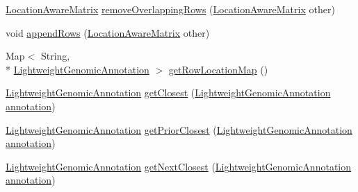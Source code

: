 \begin{DoxyCompactItemize}
\item 
\hyperlink{classbroad_1_1pda_1_1datastructures_1_1_location_aware_matrix}{Location\+Aware\+Matrix} \hyperlink{classbroad_1_1pda_1_1datastructures_1_1_location_aware_matrix_a343230e0d3a3e96ae96865bd43ebc9f3}{remove\+Overlapping\+Rows} (\hyperlink{classbroad_1_1pda_1_1datastructures_1_1_location_aware_matrix}{Location\+Aware\+Matrix} other)
\item 
void \hyperlink{classbroad_1_1pda_1_1datastructures_1_1_location_aware_matrix_acf69c339f06767a98198b6fa18150b5b}{append\+Rows} (\hyperlink{classbroad_1_1pda_1_1datastructures_1_1_location_aware_matrix}{Location\+Aware\+Matrix} other)
\item 
Map$<$ String, \\*
\hyperlink{interfacebroad_1_1core_1_1annotation_1_1_lightweight_genomic_annotation}{Lightweight\+Genomic\+Annotation} $>$ \hyperlink{classbroad_1_1pda_1_1datastructures_1_1_location_aware_matrix_a58c5ec3cf67ef67dcb837812f48b47f0}{get\+Row\+Location\+Map} ()
\item 
\hyperlink{interfacebroad_1_1core_1_1annotation_1_1_lightweight_genomic_annotation}{Lightweight\+Genomic\+Annotation} \hyperlink{classbroad_1_1pda_1_1datastructures_1_1_location_aware_matrix_a568bcf953a7d2ae720f51a9b196106c2}{get\+Closest} (\hyperlink{interfacebroad_1_1core_1_1annotation_1_1_lightweight_genomic_annotation}{Lightweight\+Genomic\+Annotation} \hyperlink{classbroad_1_1pda_1_1datastructures_1_1_location_aware_matrix_ab12829b4bec6392f73ef867a924dd00b}{annotation})
\item 
\hyperlink{interfacebroad_1_1core_1_1annotation_1_1_lightweight_genomic_annotation}{Lightweight\+Genomic\+Annotation} \hyperlink{classbroad_1_1pda_1_1datastructures_1_1_location_aware_matrix_a96adb475ad10bd7346702f01bf66b379}{get\+Prior\+Closest} (\hyperlink{interfacebroad_1_1core_1_1annotation_1_1_lightweight_genomic_annotation}{Lightweight\+Genomic\+Annotation} \hyperlink{classbroad_1_1pda_1_1datastructures_1_1_location_aware_matrix_ab12829b4bec6392f73ef867a924dd00b}{annotation})
\item 
\hyperlink{interfacebroad_1_1core_1_1annotation_1_1_lightweight_genomic_annotation}{Lightweight\+Genomic\+Annotation} \hyperlink{classbroad_1_1pda_1_1datastructures_1_1_location_aware_matrix_ac52ce4740d48e3ae918578ec24732327}{get\+Next\+Closest} (\hyperlink{interfacebroad_1_1core_1_1annotation_1_1_lightweight_genomic_annotation}{Lightweight\+Genomic\+Annotation} \hyperlink{classbroad_1_1pda_1_1datastructures_1_1_location_aware_matrix_ab12829b4bec6392f73ef867a924dd00b}{annotation})
\end{DoxyCompactItemize}
